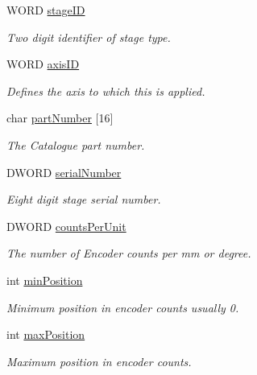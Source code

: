 \begin{DoxyCompactItemize}
\item 
W\+O\+RD \hyperlink{struct_m_o_t___stage_axis_parameters_a3fdc6e312480f6188136aadbe440f934}{stage\+ID}
\begin{DoxyCompactList}\small\item\em Two digit identifier of stage type. \end{DoxyCompactList}\item 
W\+O\+RD \hyperlink{struct_m_o_t___stage_axis_parameters_a436a4f469bfa98f9a82001d79a89b8a6}{axis\+ID}
\begin{DoxyCompactList}\small\item\em Defines the axis to which this is applied. \end{DoxyCompactList}\item 
char \hyperlink{struct_m_o_t___stage_axis_parameters_af8179302cca68141340dc1cff1fd107c}{part\+Number} \mbox{[}16\mbox{]}
\begin{DoxyCompactList}\small\item\em The Catalogue part number. \end{DoxyCompactList}\item 
D\+W\+O\+RD \hyperlink{struct_m_o_t___stage_axis_parameters_ad6d70738cafacd9481252a9100a5b7d4}{serial\+Number}
\begin{DoxyCompactList}\small\item\em Eight digit stage serial number. \end{DoxyCompactList}\item 
D\+W\+O\+RD \hyperlink{struct_m_o_t___stage_axis_parameters_a7a85dbf962eb63b3381097824dacbc07}{counts\+Per\+Unit}
\begin{DoxyCompactList}\small\item\em The number of Encoder counts per mm or degree. \end{DoxyCompactList}\item 
int \hyperlink{struct_m_o_t___stage_axis_parameters_abf285b2f9d0834dc5508237b960ebba2}{min\+Position}
\begin{DoxyCompactList}\small\item\em Minimum position in encoder counts usually 0. \end{DoxyCompactList}\item 
int \hyperlink{struct_m_o_t___stage_axis_parameters_a494060243b5102ca4af17da2374ad126}{max\+Position}
\begin{DoxyCompactList}\small\item\em Maximum position in encoder counts. \end{DoxyCompactList}\item 

\end{DoxyCompactItemize}
